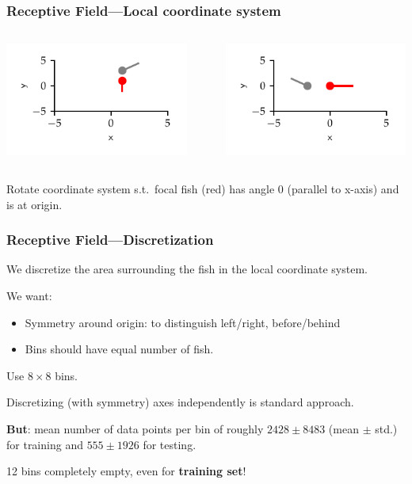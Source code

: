 \documentclass{beamer}
\begin{document}
\begin{frame}
  \frametitle{Receptive Field---Local coordinate system}
  \begin{columns}
   \begin{column}{0.5\textwidth}
     \includegraphics{receptive_field_before_beamer}
\end{column}~\begin{column}{0.5\textwidth}
     \includegraphics{receptive_field_after_beamer}
\end{column}
 \end{columns}
 
 Rotate coordinate system s.t.\ focal fish (red) has angle 0 (parallel to x-axis) and is at origin.
\end{frame}

\begin{frame}
  \frametitle{Receptive Field---Discretization}
  We discretize the area surrounding the fish in the local coordinate system.

  We want:
  \begin{itemize}
  \item Symmetry around origin: to distinguish left/right, before/behind
  \item Bins should have equal number of fish.
  \end{itemize}

  Use $8 \times 8$ bins.
  
  Discretizing (with symmetry) axes independently is standard approach.
  
  \textbf{But}:
  mean number of data points per bin of roughly \(2428\pm 8483\) (mean $\pm$ std.) for training and
  \(555 \pm 1926\) for testing.

12 bins \alert{completely empty}, even for \textbf{training set}!
\end{frame}
\end{document}
